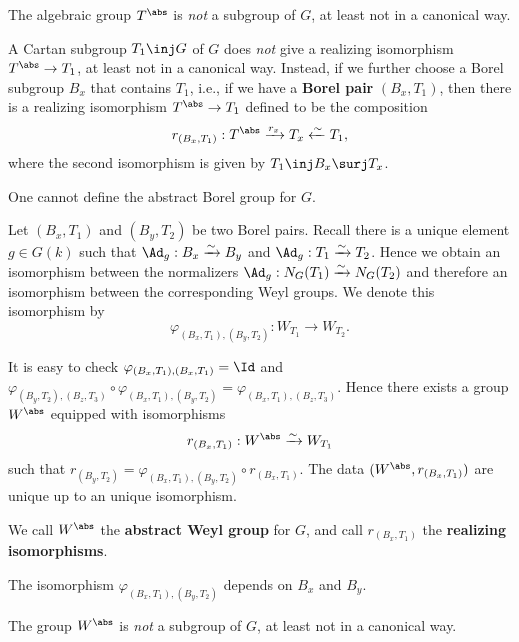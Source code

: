 	\begin{warn}
		The algebraic group $T^\abs$ is \emph{not} a subgroup of $G$, at least not in a canonical way.
	\end{warn}

	\begin{rem}
		A Cartan subgroup $T_1\inj G$ of $G$ does \emph{not} give a realizing isomorphism $T^\abs \to T_1$, at least not in a canonical way. Instead, if we further choose a Borel subgroup $B_x$ that contains $T_1$, i.e., if we have a \textbf{Borel pair} $(B_x,T_1)$, then there is a realizing isomorphism $T^\abs \to T_1$ defined to be the composition
		\[
			r_{(B_x,T_1)}:T^\abs \xrightarrow{r_x} T_x \xleftarrow{\sim} T_1,
		\]
		where the second isomorphism is given by $T_1 \inj B_x \surj T_x$.
	\end{rem}

	\begin{warn}
		One cannot define the abstract Borel group for $G$.
	\end{warn}

	\begin{constr}
		Let $(B_x,T_1)$ and $(B_y,T_2)$ be two Borel pairs. Recall there is a unique element $g\in G(k)$ such that $\Ad_g: B_x\xrightarrow{\sim} B_y$ and $\Ad_g: T_1 \xrightarrow{\sim} T_2$. Hence we obtain an isomorphism between the normalizers $\Ad_g: N_G(T_1) \xrightarrow{\sim} N_G(T_2)$ and therefore an isomorphism between the corresponding Weyl groups. We denote this isomorphism by
		\[
			\varphi_{(B_x,T_1),(B_y,T_2)}: W_{T_1} \to W_{T_2}.
		\]

		It is easy to check $\varphi_{(B_x,T_1),(B_x,T_1)}=\Id$ and $ \varphi_{(B_y,T_2),(B_z,T_3)}\circ \varphi_{(B_x,T_1),(B_y,T_2)} = \varphi_{(B_x,T_1),(B_z,T_3)} $. Hence there exists a group $W^\abs$ equipped with isomorphisms
		\[
			r_{(B_x,T_1)}: W^\abs \xrightarrow{\sim} W_{T_1}
		\]
		such that $r_{(B_y,T_2)} = \varphi_{(B_x,T_1),(B_y,T_2)}\circ r_{(B_x,T_1)}$. The data $(W^\abs, r_{(B_x,T_1)})$ are unique up to an unique isomorphism.

		We call $W^\abs$ the \textbf{abstract Weyl group} for $G$, and call $r_{(B_x,T_1)}$ the \textbf{realizing isomorphisms}.

	\end{constr}

	\begin{warn}
		The isomorphism $\varphi_{(B_x,T_1),(B_y,T_2)}$ depends on $B_x$ and $B_y$.
	\end{warn}

	\begin{warn}
		The group $W^\abs$ is \emph{not} a subgroup of $G$, at least not in a canonical way.
	\end{warn}

